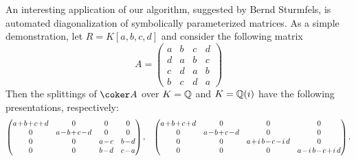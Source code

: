 \documentclass[12pt]{article}
\numberwithin{equation}{section}
\theoremstyle{theorem}
\numberwithin{thm}{section}
\theoremstyle{definition}
\newcommand{\mahrud}[1]{{\color{ForestGreen} \sf $\blacklozenge$ Mahrud: [#1]}}
\begin{document}
\begin{exa}\label{example:QQ}
  An interesting application of our algorithm, suggested by Bernd Sturmfels,  is automated diagonalization of symbolically parameterized matrices. As a simple demonstration, let $R = K[a,b,c,d]$ and consider the following matrix
  \[ A = \begin{pmatrix}
    a&b&c&d\\
    d&a&b&c\\
    c&d&a&b\\
    b&c&d&a
  \end{pmatrix} \]
  Then the splittings of $\coker A$ over $K = \mathbb Q$ and $K = \mathbb Q(i)$ have the following presentations, respectively:
  \[\medmuskip1.5mu \begin{pmatrix}
    a+b+c+d&0&0&0\\
    0&a-b+c-d&0&0\\
    0&0&a-c&b-d\\
    0&0&b-d&c-a
  \end{pmatrix},
\quad
  \begin{pmatrix}
    a+b+c+d&0&0&0\\
    0&a-b+c-d&0&0\\
    0&0&a+i\,b-c-i\,d&0\\
    0&0&0&a-i\,b-c+i\,d
  \end{pmatrix}.
  \]
\end{exa}





\end{document}
